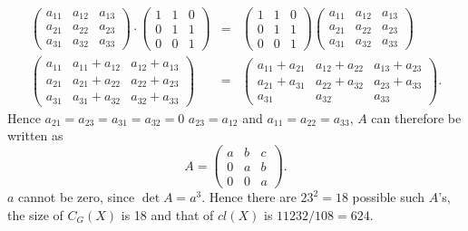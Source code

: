 \documentclass[11pt]{article} \usepackage{amssymb}
\begin{document}
\begin{enumerate}
\begin{enumerate}
\begin{itemize}
        \begin{eqnarray*}
          \begin{pmatrix}
            a_{11}&a_{12}  &a_{13} \\ 
            a_{21}&a_{22}  &a_{23} \\ 
            a_{31}&a_{32}  &a_{33} 
          \end{pmatrix}
          \cdot
          \begin{pmatrix}
            1&1  &0 \\ 
            0&1  &1 \\ 
            0&0  &1 
          \end{pmatrix}
          &=&
          \begin{pmatrix}
            1&1  &0 \\ 
            0&1  &1 \\ 
            0&0  &1 
          \end{pmatrix}
          \begin{pmatrix}
            a_{11}&a_{12}  &a_{13} \\ 
            a_{21}&a_{22}  &a_{23} \\ 
            a_{31}&a_{32}  &a_{33} 
          \end{pmatrix}
          \\
          \begin{pmatrix}
            a_{11}&a_{11}+a_{12}  &a_{12}+a_{13} \\ 
            a_{21}&a_{21}+a_{22}  &a_{22}+a_{23} \\ 
            a_{31}&a_{31}+a_{32}  &a_{32}+a_{33} 
          \end{pmatrix}
          &=&
          \begin{pmatrix}
            a_{11}+a_{21}&a_{12}+a_{22}  &a_{13}+a_{23} \\ 
            a_{21}+a_{31}&a_{22}+a_{32}  &a_{23}+a_{33} \\ 
            a_{31}&a_{32}  &a_{33} 
          \end{pmatrix}.
        \end{eqnarray*}
        Hence $a_{21}=a_{23}=a_{31}=a_{32}=0$ $a_{23}=a_{12}$ and 
        $a_{11}=a_{22}=a_{33}$, 
        $A$ can therefore be written as
        \begin{equation*}
          A=
          \begin{pmatrix}
            a &b  &c \\ 
            0 &a  &b \\ 
            0 &0  &a 
          \end{pmatrix}.
        \end{equation*}
        $a$ cannot be zero, since $\det A=a^3$. Hence there
        are $23^2=18$ possible such $A$'s, the size of $C_G(X)$ is 18
        and that of  $cl(X)$ is $11232/108=624$.


\end{itemize}
\end{enumerate}
\end{enumerate}
\end{document}
